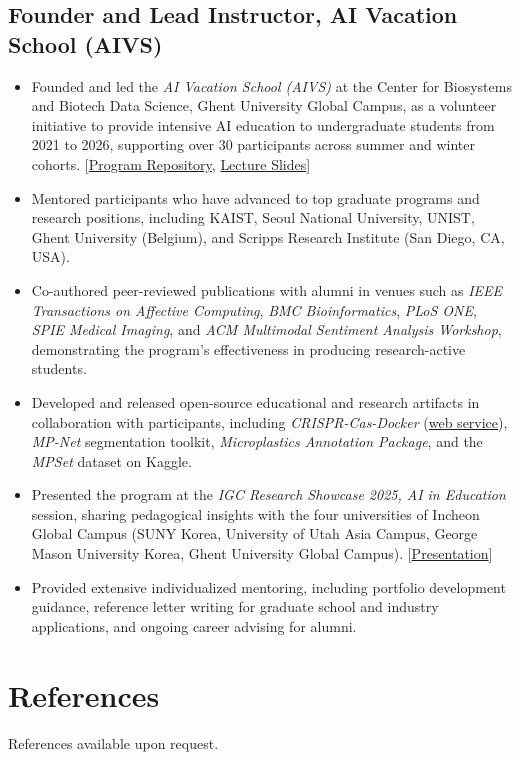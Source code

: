 \documentclass[11pt]{article}
\begin{document}
\subsection{Founder and Lead Instructor, AI Vacation School (AIVS)}
\begin{itemize}
    \item[\checkmark] Founded and led the \textit{AI Vacation School (AIVS)} at the Center for Biosystems and Biotech Data Science, Ghent University Global Campus, as a volunteer initiative to provide intensive AI education to undergraduate students from 2021 to 2026, supporting over 30 participants across summer and winter cohorts. [\href{https://github.com/powersimmani/AIVS}{Program Repository}, \href{https://powersimmani.github.io/AIVS_Lecture_Slides/}{Lecture Slides}]
    \item[\checkmark] Mentored participants who have advanced to top graduate programs and research positions, including KAIST, Seoul National University, UNIST, Ghent University (Belgium), and Scripps Research Institute (San Diego, CA, USA).
    \item[\checkmark] Co-authored peer-reviewed publications with alumni in venues such as \textit{IEEE Transactions on Affective Computing}, \textit{BMC Bioinformatics}, \textit{PLoS ONE}, \textit{SPIE Medical Imaging}, and \textit{ACM Multimodal Sentiment Analysis Workshop}, demonstrating the program's effectiveness in producing research-active students.
    \item[\checkmark] Developed and released open-source educational and research artifacts in collaboration with participants, including \textit{CRISPR-Cas-Docker} (\href{http://www.crisprcasdocker.org/}{web service}), \textit{MP-Net} segmentation toolkit, \textit{Microplastics Annotation Package}, and the \textit{MPSet} dataset on Kaggle.
    \item[\checkmark] Presented the program at the \textit{IGC Research Showcase 2025, AI in Education} session, sharing pedagogical insights with the four universities of Incheon Global Campus (SUNY Korea, University of Utah Asia Campus, George Mason University Korea, Ghent University Global Campus). [\href{https://www.dropbox.com/scl/fi/3cdkfs2v846sj1g000jo6/IGC-Research-Showcases-Ho-min-Park.pdf?rlkey=s7qrhj4vva4u2rpboeccoa5aq&st=1mlzmm6j&dl=0}{Presentation}]
    \item[\checkmark] Provided extensive individualized mentoring, including portfolio development guidance, reference letter writing for graduate school and industry applications, and ongoing career advising for alumni.
\end{itemize}

\section{References}
\textcolor{Sepia}{References available upon request.}
\end{document}
